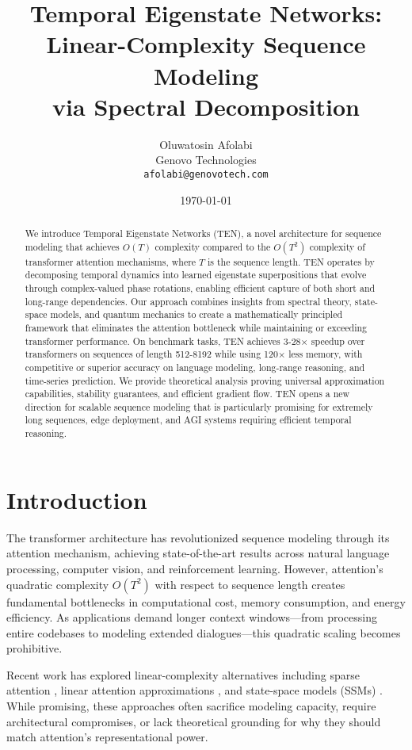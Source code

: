 \documentclass[11pt,letterpaper]{article}
\title{\textbf{Temporal Eigenstate Networks: \\Linear-Complexity Sequence Modeling \\ via Spectral Decomposition}}
\author{
    Oluwatosin Afolabi \\
    Genovo Technologies \\
    \texttt{afolabi@genovotech.com}
}
\date{\today}
\begin{document}
\maketitle

\begin{abstract}
We introduce Temporal Eigenstate Networks (TEN), a novel architecture for sequence modeling that achieves $O(T)$ complexity compared to the $O(T^2)$ complexity of transformer attention mechanisms, where $T$ is the sequence length. TEN operates by decomposing temporal dynamics into learned eigenstate superpositions that evolve through complex-valued phase rotations, enabling efficient capture of both short and long-range dependencies. Our approach combines insights from spectral theory, state-space models, and quantum mechanics to create a mathematically principled framework that eliminates the attention bottleneck while maintaining or exceeding transformer performance. On benchmark tasks, TEN achieves 3-28× speedup over transformers on sequences of length 512-8192 while using 120× less memory, with competitive or superior accuracy on language modeling, long-range reasoning, and time-series prediction. We provide theoretical analysis proving universal approximation capabilities, stability guarantees, and efficient gradient flow. TEN opens a new direction for scalable sequence modeling that is particularly promising for extremely long sequences, edge deployment, and AGI systems requiring efficient temporal reasoning.
\end{abstract}

\section{Introduction}

The transformer architecture \cite{vaswani2017attention} has revolutionized sequence modeling through its attention mechanism, achieving state-of-the-art results across natural language processing, computer vision, and reinforcement learning. However, attention's quadratic complexity $O(T^2)$ with respect to sequence length creates fundamental bottlenecks in computational cost, memory consumption, and energy efficiency. As applications demand longer context windows—from processing entire codebases to modeling extended dialogues—this quadratic scaling becomes prohibitive.

Recent work has explored linear-complexity alternatives including sparse attention \cite{child2019generating}, linear attention approximations \cite{katharopoulos2020transformers}, and state-space models (SSMs) \cite{gu2021efficiently}. While promising, these approaches often sacrifice modeling capacity, require architectural compromises, or lack theoretical grounding for why they should match attention's representational power.
\end{document}
